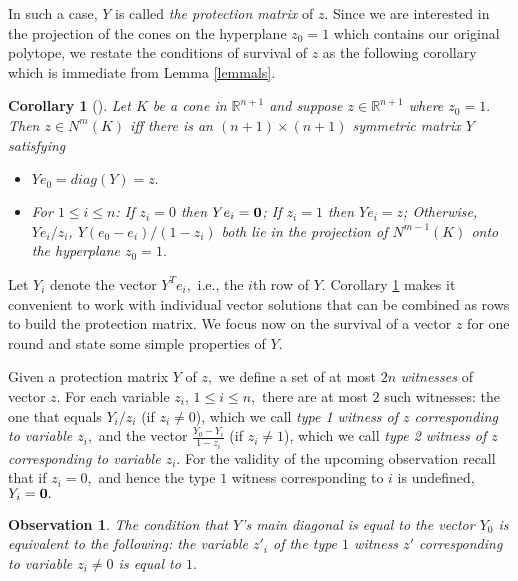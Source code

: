 \documentclass[11pt]{article}\usepackage{amsmath}
\newtheorem{corollary}{Corollary}[section]
\newtheorem{observation}{Observation}[section]
\begin{document}
In such a case, $Y$ is called \emph{the protection matrix} of $z$. Since we are interested in
the projection of the cones on the hyperplane $z_0=1$ which contains our
original polytope, we restate the conditions of survival of $z$ as the following
corollary which is immediate from Lemma \ref{lemmals}.


\begin{corollary} [\cite{AroraBL02}]\label{corls}
 Let $K$ be a cone in $\mathbb{R}^{n+1}$ and suppose $z \in \mathbb{R}^{n+1}$ 
where $z_0 = 1.$ Then $z \in N^m(K)$ iff there
is an $(n+1)\times(n+1)$ symmetric matrix $Y$ satisfying

\begin{itemize}
\item[1.]  $Ye_0= diag(Y) = z.$
\item[2.]  For $1 \leq i \leq n$: If $z_i = 0$ then $Ye_i ={\bf 0}$; 
If $z_i =1$ then $Ye_i=z$; Otherwise, $Ye_i/z_i$, $Y(e_0-e_i)/(1-z_i)$
both lie in the projection of $N^{m-1}(K)$ onto the hyperplane $z_0 = 1.$
\end{itemize}
\end{corollary}


Let $Y_i$ denote the vector $Y^Te_i,$ i.e., the $i$th row of $Y.$ 
Corollary  \ref{corls} makes  it  convenient to  work with  individual
vector solutions that can be  combined as rows to build the protection
matrix. 
 We focus now on the survival of
a vector  $z$ for one  round and state  some simple properties of $Y.$ 


Given a protection matrix $Y$ of $z,$ 
we define a set of at most $2n$ {\em
  witnesses} of vector $z.$ For each variable $z_i$, $1\leq i \leq n,$ there are at most
$2$ such witnesses: the one that equals $Y_{{i}}/z_{i}$
(if  $z_i\neq 0$),   which we  call \emph{type  1 witness  of $z$
  corresponding to variable $z_i,$} and the vector $\frac{Y_0-Y_{i}}{1-z_i}$
(if $z_i \neq 1$), which we call \emph{type 2 witness of $z$
  corresponding to  variable $z_i.$} For the validity  of the upcoming
observation recall  that if $z_i =0,$  and hence the  type $1$ witness
corresponding to $i$ is undefined, $Y_i = {\bf 0}.$ 

\begin{observation}\label{obs_diag}
The condition that $Y$'s main diagonal is equal to the vector $Y_0$ is
equivalent to the following: the variable $z'_i$ of the type $1$ witness
$z'$ corresponding to variable $z_i\neq 0$ is equal to $1.$
\end{observation}
\end{document}
